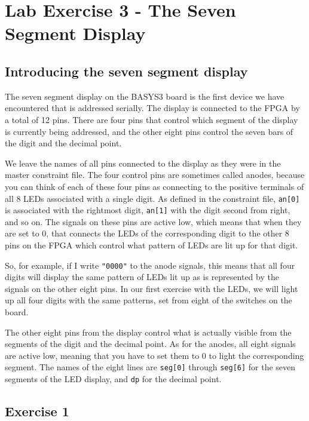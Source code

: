 \documentclass[../physical_computing.tex]{subfiles}
\begin{document}
\chapter{Lab Exercise 3 - The Seven Segment Display}
\label{sec:appendix_4}

\section{Introducing the seven segment display}
\label{sec:slow_clock}

The seven segment display on the BASYS3 board is the first device we have encountered that is addressed serially. The display is connected to the FPGA by a total of 12 pins. There are four pins that control which segment of the display is currently being addressed, and the other eight pins control the seven bars of the digit and the decimal point. 

We leave the names of all pins connected to the display as they were in the master constraint file. The four control pins are sometimes called anodes, because you can think of each of these four pins as connecting to the positive terminals of all 8 LEDs associated with a single digit. As defined in the constraint file, \texttt{an[0]} is associated with the rightmost digit, \texttt{an[1]} with the digit second from right, and so on. The signals on these pins are active low, which means that when they are set to $0$, that connects the LEDs of the corresponding digit to the other 8 pins on the FPGA which control what pattern of LEDs are lit up for that digit. 

So, for example, if I write \texttt{"0000"} to the anode signals, this means that all four digits will display the same pattern of LEDs lit up as is represented by the signals on the other eight pins. In our first exercise with the LEDs, we will light up all four digits with the same patterns, set from eight of the switches on the board.

The other eight pins from the display control what is actually visible from the segments of the digit and the decimal point. As for the anodes, all eight signals are active low, meaning that you have to set them to $0$ to light the corresponding segment. The names of the eight lines are \texttt{seg[0]} through \texttt{seg[6]} for the seven segments of the LED display, and \texttt{dp} for the decimal point. 

\section{Exercise 1}
\label{sec:lightson}
\end{document}
